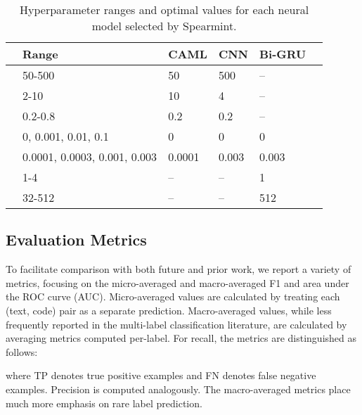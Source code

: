 \documentclass[11pt,a4paper]{article}
\begin{document}
\begin{table}
\centering
  \small
\begin{tabular}{lp{2.4cm}llll}
  \toprule
 & Range & CAML & CNN & Bi-GRU \\ \midrule
 & 50-500 & 50 & 500 & -- \\
 & 2-10 & 10 & 4 & -- \\
 & 0.2-0.8 & 0.2 & 0.2 & -- \\
 & 0, 0.001, 0.01, 0.1 & 0 & 0 & 0 \\
 & 0.0001, 0.0003, 0.001, 0.003 & 0.0001 & 0.003 & 0.003 \\
 & 1-4 & -- & -- & 1 \\
 & 32-512 & -- & -- & 512 \\ \bottomrule
\end{tabular}
\caption{Hyperparameter ranges and optimal values for each neural model selected by Spearmint.
  }
\label{tab:hyperparams}
\end{table} 
\subsection{Evaluation Metrics}
To facilitate comparison with both future and prior work, we report a variety of metrics, focusing on the micro-averaged and macro-averaged F1 and area under the ROC curve (AUC). Micro-averaged values are calculated by treating each (text, code) pair as a separate prediction. Macro-averaged values, while less frequently reported in the multi-label classification literature, are calculated by averaging metrics computed per-label. For recall, the metrics are distinguished as follows:

where TP denotes true positive examples and FN denotes false negative examples. Precision is computed analogously. The macro-averaged metrics place much more emphasis on rare label prediction. 
\end{document}
